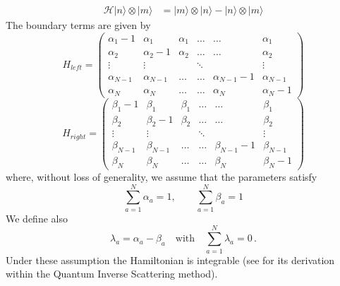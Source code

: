 \documentclass[11pt]{article}
\numberwithin{equation}{section}
\numberwithin{equation}{subsection}
\begin{document}
\begin{equation}
	\begin{split}
		\mathcal{H}|n\rangle\otimes   |m\rangle&=|m\rangle \otimes |n\rangle-|n\rangle \otimes|m\rangle
	\end{split}
\end{equation}
The boundary terms are given by 
\begin{equation}
	H_{left}=\begin{pmatrix}
		\alpha_{1}-1&\alpha_{1}&\alpha_{1}&\ldots&\ldots&\alpha_{1}\\
		\alpha_{2}&\alpha_{2}-1&\alpha_{2}&\ldots&\ldots&\alpha_{2}\\
		\vdots&\vdots& &\ddots& &\vdots\\
		\alpha_{N-1}&\alpha_{N-1}&\ldots&\ldots&\alpha_{N-1}-1&\alpha_{N-1}\\
		\alpha_{N}&\alpha_{N}&\ldots&\ldots&\alpha_{N}&\alpha_{N}-1
	\end{pmatrix}
\end{equation}
\begin{equation}
	H_{right}=\begin{pmatrix}
		\beta_{1}-1&\beta_{1}&\beta_{1}&\ldots&\ldots&\beta_{1}\\
		\beta_{2}&\beta_{2}-1&\beta_{2}&\ldots&\ldots&\beta_{2}\\
		\vdots&\vdots& &\ddots& &\vdots\\
		\beta_{N-1}&\beta_{N-1}&\ldots&\ldots&\beta_{N-1}-1&\beta_{N-1}\\
		\beta_{N}&\beta_{N}&\ldots&\ldots&\beta_{N}&\beta_{N}-1
	\end{pmatrix}
\end{equation}
where, without loss of generality,  we assume that the parameters satisfy
\begin{equation}\label{ratesConditions}
	\sum_{a=1}^{N}\alpha_{a}=1,\qquad\sum_{a=1}^{N}\beta_{a}=1
\end{equation} 
We define also 
\begin{equation}\label{lambdaConditions}
	\lambda_{a}=\alpha_{a}-\beta_{a}\quad\text{with}\quad \sum_{a=1}^{N}\lambda_{a}=0\,.
\end{equation}
Under these assumption the Hamiltonian is integrable (see \cite{vanicat2017exact} for its derivation within the Quantum Inverse Scattering method). \\
\end{document}
